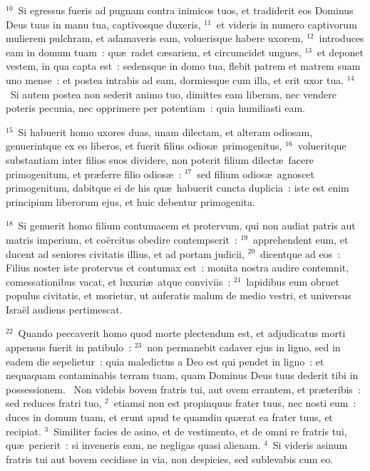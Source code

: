 ${}^{10}$~Si egressus fueris ad pugnam contra inimicos tuos, et tradiderit eos Dominus Deus tuus in manu tua, captivosque duxeris,
${}^{11}$~et videris in numero captivorum mulierem pulchram, et adamaveris eam, voluerisque habere uxorem,
${}^{12}$~introduces eam in domum tuam~: qu\ae\ radet c\ae sariem, et circumcidet ungues,
${}^{13}$~et deponet vestem, in qua capta est~: sedensque in domo tua, flebit patrem et matrem suam uno mense~: et postea intrabis ad eam, dormiesque cum illa, et erit uxor tua.
${}^{14}$~Si autem postea non sederit animo tuo, dimittes eam liberam, nec vendere poteris pecunia, nec opprimere per potentiam~: quia humiliasti eam.


${}^{15}$~Si habuerit homo uxores duas, unam dilectam, et alteram odiosam, genuerintque ex eo liberos, et fuerit filius odios\ae\ primogenitus,
${}^{16}$~volueritque substantiam inter filios suos dividere, non poterit filium dilect\ae\ facere primogenitum, et pr\ae ferre filio odios\ae~:
${}^{17}$~sed filium odios\ae\ agnoscet primogenitum, dabitque ei de his qu\ae\ habuerit cuncta duplicia~: iste est enim principium liberorum ejus, et huic debentur primogenita.


${}^{18}$~Si genuerit homo filium contumacem et protervum, qui non audiat patris aut matris imperium, et co\"ercitus obedire contempserit~:
${}^{19}$~apprehendent eum, et ducent ad seniores civitatis illius, et ad portam judicii,
${}^{20}$~dicentque ad eos~: Filius noster iste protervus et contumax est~: monita nostra audire contemnit, comessationibus vacat, et luxuri\ae\ atque conviviis~:
${}^{21}$~lapidibus eum obruet populus civitatis, et morietur, ut auferatis malum de medio vestri, et universus Isra\"el audiens pertimescat.


${}^{22}$~Quando peccaverit homo quod morte plectendum est, et adjudicatus morti appensus fuerit in patibulo~:
${}^{23}$~non permanebit cadaver ejus in ligno, sed in eadem die sepelietur~: quia maledictus a Deo est qui pendet in ligno~: et nequaquam contaminabis terram tuam, quam Dominus Deus tuus dederit tibi in possessionem.
~\lettrine[lines=10,image=true,loversize=0.05,lraise=-0.03]{N}{}on videbis bovem fratris tui, aut ovem errantem, et pr\ae teribis~: sed reduces fratri tuo,
${}^{2}$~etiamsi non est propinquus frater tuus, nec nosti eum~: duces in domum tuam, et erunt apud te quamdiu qu\ae rat ea frater tuus, et recipiat.
${}^{3}$~Similiter facies de asino, et de vestimento, et de omni re fratris tui, qu\ae\ perierit~: si inveneris eam, ne negligas quasi alienam.
${}^{4}$~Si videris asinum fratris tui aut bovem cecidisse in via, non despicies, sed sublevabis cum eo.



